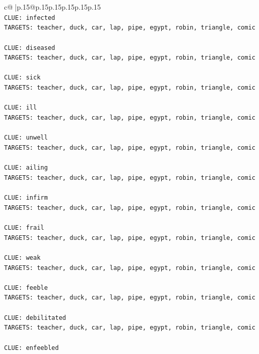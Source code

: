 \documentclass{article}
\begin{document}
{\begin{supertabular}{c@{$\;$}|p{.15\linewidth}@{}p{.15\linewidth}p{.15\linewidth}p{.15\linewidth}p{.15\linewidth}p{.15\linewidth}}
{{{\\ 
\texttt{CLUE: infected} \\
\texttt{TARGETS: teacher, duck, car, lap, pipe, egypt, robin, triangle, comic} \\
\\ 
\texttt{CLUE: diseased} \\
\texttt{TARGETS: teacher, duck, car, lap, pipe, egypt, robin, triangle, comic} \\
\\ 
\texttt{CLUE: sick} \\
\texttt{TARGETS: teacher, duck, car, lap, pipe, egypt, robin, triangle, comic} \\
\\ 
\texttt{CLUE: ill} \\
\texttt{TARGETS: teacher, duck, car, lap, pipe, egypt, robin, triangle, comic} \\
\\ 
\texttt{CLUE: unwell} \\
\texttt{TARGETS: teacher, duck, car, lap, pipe, egypt, robin, triangle, comic} \\
\\ 
\texttt{CLUE: ailing} \\
\texttt{TARGETS: teacher, duck, car, lap, pipe, egypt, robin, triangle, comic} \\
\\ 
\texttt{CLUE: infirm} \\
\texttt{TARGETS: teacher, duck, car, lap, pipe, egypt, robin, triangle, comic} \\
\\ 
\texttt{CLUE: frail} \\
\texttt{TARGETS: teacher, duck, car, lap, pipe, egypt, robin, triangle, comic} \\
\\ 
\texttt{CLUE: weak} \\
\texttt{TARGETS: teacher, duck, car, lap, pipe, egypt, robin, triangle, comic} \\
\\ 
\texttt{CLUE: feeble} \\
\texttt{TARGETS: teacher, duck, car, lap, pipe, egypt, robin, triangle, comic} \\
\\ 
\texttt{CLUE: debilitated} \\
\texttt{TARGETS: teacher, duck, car, lap, pipe, egypt, robin, triangle, comic} \\
\\ 
\texttt{CLUE: enfeebled} \\
}}}
\end{supertabular}}
\end{document}

